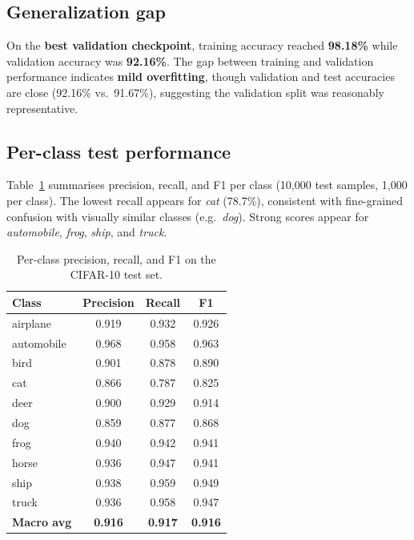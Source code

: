 \documentclass[11pt,a4paper]{article}
\begin{document}
\subsection{Generalization gap}
On the \textbf{best validation checkpoint}, training accuracy reached \textbf{98.18\%} while validation accuracy was \textbf{92.16\%}. The gap between training and validation performance indicates \textbf{mild overfitting}, though validation and test accuracies are close (92.16\% vs.\ 91.67\%), suggesting the validation split was reasonably representative.

\subsection{Per-class test performance}
Table~\ref{tab:perclass} summarises precision, recall, and F1 per class (10{,}000 test samples, 1{,}000 per class). The lowest recall appears for \textit{cat} (78.7\%), consistent with fine-grained confusion with visually similar classes (e.g.\ \textit{dog}). Strong scores appear for \textit{automobile}, \textit{frog}, \textit{ship}, and \textit{truck}.

\begin{table}[ht]
  \centering
  \caption{Per-class precision, recall, and F1 on the CIFAR-10 test set.}
  \label{tab:perclass}
  \small
  \begin{tabular}{@{}lccc@{}}
    \toprule
    Class & Precision & Recall & F1 \\
    \midrule
    airplane   & 0.919 & 0.932 & 0.926 \\
    automobile & 0.968 & 0.958 & 0.963 \\
    bird       & 0.901 & 0.878 & 0.890 \\
    cat        & 0.866 & 0.787 & 0.825 \\
    deer       & 0.900 & 0.929 & 0.914 \\
    dog        & 0.859 & 0.877 & 0.868 \\
    frog       & 0.940 & 0.942 & 0.941 \\
    horse      & 0.936 & 0.947 & 0.941 \\
    ship       & 0.938 & 0.959 & 0.949 \\
    truck      & 0.936 & 0.958 & 0.947 \\
    \midrule
    \textbf{Macro avg} & \textbf{0.916} & \textbf{0.917} & \textbf{0.916} \\
    \bottomrule
  \end{tabular}
\end{table}
\end{document}
